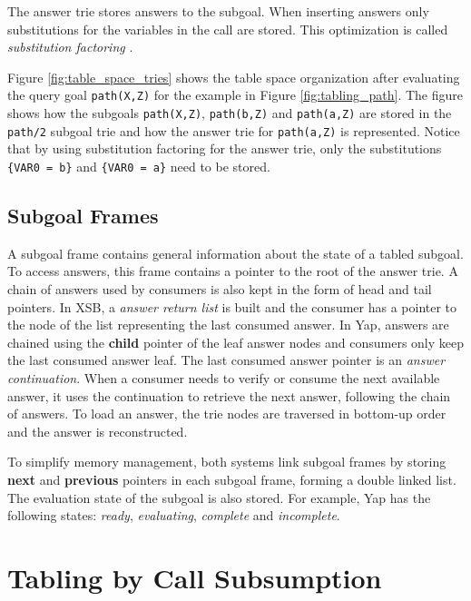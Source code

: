 The answer trie stores answers to the subgoal. When inserting answers only substitutions
for the variables in the call are stored. This optimization is called \textit{substitution factoring} \cite{RamakrishnanIV-95}.

Figure \ref{fig:table_space_tries} shows the table space organization after evaluating the query goal
\texttt{path(X,Z)} for the example in Figure \ref{fig:tabling_path}.
The figure shows how the subgoals \texttt{path(X,Z)}, \texttt{path(b,Z)} and \texttt{path(a,Z)} are
stored in the \texttt{path/2} subgoal trie and how the answer trie for \texttt{path(a,Z)} is represented.
Notice that by using substitution factoring for the answer trie, only the substitutions
\texttt{\{VAR0 = b\}} and \texttt{\{VAR0 = a\}} need to be stored.

\subsection{Subgoal Frames}

A subgoal frame contains general information about the state of a tabled subgoal. To access answers, this
frame contains a pointer to the root of the answer trie. A chain of answers used by consumers is also kept
in the form of head and tail pointers. In XSB, a \textit{answer return list} is built and the consumer has
a pointer to the node of the list representing the last consumed answer. In Yap, answers are chained using
the \textbf{child} pointer of the leaf answer nodes and consumers only keep the last consumed answer leaf.
The last consumed answer pointer is an \textit{answer continuation}. When a consumer needs to verify
or consume the next available answer, it uses the continuation to retrieve the next answer, following the
chain of answers. To load an answer, the trie nodes are traversed in bottom-up order and the answer is
reconstructed.

To simplify memory management, both systems link subgoal frames by storing
\textbf{next} and \textbf{previous} pointers in each subgoal frame, forming a double linked list.
The evaluation state of the subgoal is also stored. For example, Yap has the following states:
\textit{ready}, \textit{evaluating}, \textit{complete} and \textit{incomplete}.

\section{Tabling by Call Subsumption} \label{sec:subsumption}

